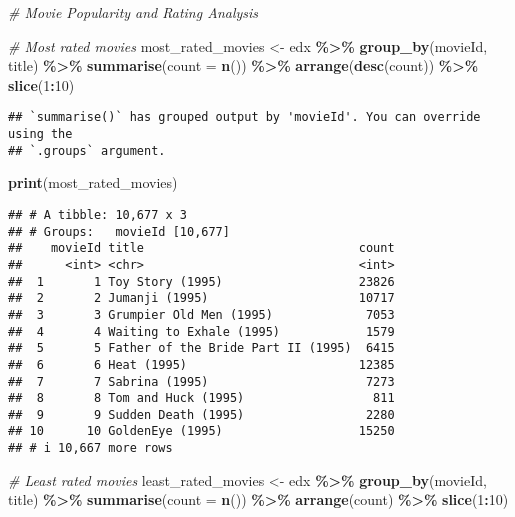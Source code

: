 \documentclass[
]{article}
\newenvironment{Shaded}{\begin{snugshade}}{\end{snugshade}}
\newcommand{\AttributeTok}[1]{\textcolor[rgb]{0.13,0.29,0.53}{#1}}
\newcommand{\CommentTok}[1]{\textcolor[rgb]{0.56,0.35,0.01}{\textit{#1}}}
\newcommand{\DecValTok}[1]{\textcolor[rgb]{0.00,0.00,0.81}{#1}}
\newcommand{\FunctionTok}[1]{\textcolor[rgb]{0.13,0.29,0.53}{\textbf{#1}}}
\newcommand{\NormalTok}[1]{#1}
\newcommand{\OtherTok}[1]{\textcolor[rgb]{0.56,0.35,0.01}{#1}}
\newcommand{\SpecialCharTok}[1]{\textcolor[rgb]{0.81,0.36,0.00}{\textbf{#1}}}
\begin{document}
\begin{Shaded}
\begin{Highlighting}[]
\CommentTok{\# Movie Popularity and Rating Analysis}

\CommentTok{\# Most rated movies}
\NormalTok{most\_rated\_movies }\OtherTok{\textless{}{-}}\NormalTok{ edx }\SpecialCharTok{\%\textgreater{}\%}
  \FunctionTok{group\_by}\NormalTok{(movieId, title) }\SpecialCharTok{\%\textgreater{}\%}
  \FunctionTok{summarise}\NormalTok{(}\AttributeTok{count =} \FunctionTok{n}\NormalTok{()) }\SpecialCharTok{\%\textgreater{}\%}
  \FunctionTok{arrange}\NormalTok{(}\FunctionTok{desc}\NormalTok{(count)) }\SpecialCharTok{\%\textgreater{}\%}
  \FunctionTok{slice}\NormalTok{(}\DecValTok{1}\SpecialCharTok{:}\DecValTok{10}\NormalTok{)}
\end{Highlighting}
\end{Shaded}

\begin{verbatim}
## `summarise()` has grouped output by 'movieId'. You can override using the
## `.groups` argument.
\end{verbatim}

\begin{Shaded}
\begin{Highlighting}[]
\FunctionTok{print}\NormalTok{(most\_rated\_movies)}
\end{Highlighting}
\end{Shaded}

\begin{verbatim}
## # A tibble: 10,677 x 3
## # Groups:   movieId [10,677]
##    movieId title                              count
##      <int> <chr>                              <int>
##  1       1 Toy Story (1995)                   23826
##  2       2 Jumanji (1995)                     10717
##  3       3 Grumpier Old Men (1995)             7053
##  4       4 Waiting to Exhale (1995)            1579
##  5       5 Father of the Bride Part II (1995)  6415
##  6       6 Heat (1995)                        12385
##  7       7 Sabrina (1995)                      7273
##  8       8 Tom and Huck (1995)                  811
##  9       9 Sudden Death (1995)                 2280
## 10      10 GoldenEye (1995)                   15250
## # i 10,667 more rows
\end{verbatim}

\begin{Shaded}
\begin{Highlighting}[]
\CommentTok{\# Least rated movies}
\NormalTok{least\_rated\_movies }\OtherTok{\textless{}{-}}\NormalTok{ edx }\SpecialCharTok{\%\textgreater{}\%}
  \FunctionTok{group\_by}\NormalTok{(movieId, title) }\SpecialCharTok{\%\textgreater{}\%}
  \FunctionTok{summarise}\NormalTok{(}\AttributeTok{count =} \FunctionTok{n}\NormalTok{()) }\SpecialCharTok{\%\textgreater{}\%}
  \FunctionTok{arrange}\NormalTok{(count) }\SpecialCharTok{\%\textgreater{}\%}
  \FunctionTok{slice}\NormalTok{(}\DecValTok{1}\SpecialCharTok{:}\DecValTok{10}\NormalTok{)}
\end{Highlighting}
\end{Shaded}
\end{document}
